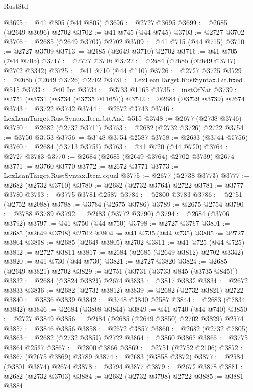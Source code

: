 \begin{lexlean}{RustStd}
\begin{coremodule}
@3695 := @41 @805 (@44 @805)
@3696 := @2727 @3695
@3699 := @2685 (@2649 @3696) @2702
@3702 := @41 @745 (@44 @745)
@3703 := @2727 @3702
@3706 := @2685 (@2649 @3703) @2702
@3709 := @41 @715 (@44 @715)
@3710 := @2727 @3709
@3713 := @2685 (@2649 @3710) @2702
@3716 := @41 @705 (@44 @705)
@3717 := @2727 @3716
@3722 := @2684 (@2685 (@2649 @3717) @2702 @3342)
@3725 := @41 @710 (@44 @710)
@3726 := @2727 @3725
@3729 := @2685 (@2649 @3726) @2702
@3731 := LexLeanTarget.RustSyntax.Lit.fixed @515
@3733 := @40 Int
@3734 := @3733 @1165
@3735 := instOfNat
@3739 := @2751 (@3731 (@3734 (@3735 @1165)))
@3742 := @2684 (@3729 @3739) @2674
@3743 := @3722 @3742
@3744 := @2672 @3743
@3746 := LexLeanTarget.RustSyntax.Item.bitAnd @515
@3748 := @2677 (@2738 @3746)
@3750 := @2682 (@2732 @3717)
@3753 := @2682 (@2732 @3726) @2722
@3754 := @3750 @3753
@3756 := @3748 @3754 @2587
@3758 := @2683 (@3744 @3756)
@3760 := @2684 (@3713 @3758)
@3763 := @41 @720 (@44 @720)
@3764 := @2727 @3763
@3770 := @2684 (@2685 (@2649 @3764) @2702 @3739) @2674
@3771 := @3760 @3770
@3772 := @2672 @3771
@3773 := LexLeanTarget.RustSyntax.Item.equal
@3775 := @2677 (@2738 @3773)
@3777 := @2682 (@2732 @3710)
@3780 := @2682 (@2732 @3764) @2722
@3781 := @3777 @3780
@3783 := @3775 @3781 @2587
@3784 := @2800 @3783
@3786 := @2751 (@2752 @2088)
@3788 := @3784 (@2675 @3786)
@3789 := @2675 @2754
@3790 := @3788 @3789
@3792 := @2683 (@3772 @3790)
@3794 := @2684 (@3706 @3792)
@3797 := @41 @750 (@44 @750)
@3798 := @2727 @3797
@3801 := @2685 (@2649 @3798) @2702
@3804 := @41 @735 (@44 @735)
@3805 := @2727 @3804
@3808 := @2685 (@2649 @3805) @2702
@3811 := @41 @725 (@44 @725)
@3812 := @2727 @3811
@3817 := @2684 (@2685 (@2649 @3812) @2702 @3342)
@3820 := @41 @730 (@44 @730)
@3821 := @2727 @3820
@3824 := @2685 (@2649 @3821) @2702
@3829 := @2751 (@3731 (@3733 @845 (@3735 @845)))
@3832 := @2684 (@3824 @3829) @2674
@3833 := @3817 @3832
@3834 := @2672 @3833
@3836 := @2682 (@2732 @3812)
@3839 := @2682 (@2732 @3821) @2722
@3840 := @3836 @3839
@3842 := @3748 @3840 @2587
@3844 := @2683 (@3834 @3842)
@3846 := @2684 (@3808 @3844)
@3849 := @41 @740 (@44 @740)
@3850 := @2727 @3849
@3856 := @2684 (@2685 (@2649 @3850) @2702 @3829) @2674
@3857 := @3846 @3856
@3858 := @2672 @3857
@3860 := @2682 (@2732 @3805)
@3863 := @2682 (@2732 @3850) @2722
@3864 := @3860 @3863
@3866 := @3775 @3864 @2587
@3867 := @2800 @3866
@3869 := @2751 (@2752 @2106)
@3872 := @3867 (@2675 @3869) @3789
@3874 := @2683 (@3858 @3872)
@3877 := @2684 (@3801 @3874) @2674
@3878 := @3794 @3877
@3879 := @2672 @3878
@3881 := @2682 (@2732 @3703)
@3884 := @2682 (@2732 @3798) @2722
@3885 := @3881 @3884

\end{coremodule}
\end{lexlean}
